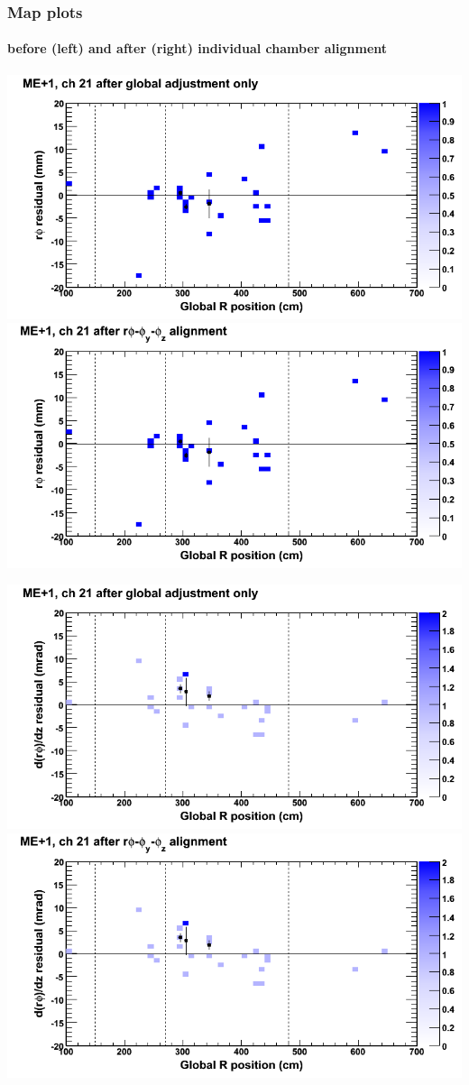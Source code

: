 \documentclass[compress]{beamer}
\begin{document}
\begin{frame}
\frametitle{Map plots}
\framesubtitle{before (left) and after (right) individual chamber alignment}
\includegraphics[width=0.5\linewidth]{ringmapplots_3dof/before_CSCvsr_mep1ch21_x.png} \includegraphics[width=0.5\linewidth]{ringmapplots_3dof/after_CSCvsr_mep1ch21_x.png}

\includegraphics[width=0.5\linewidth]{ringmapplots_3dof/before_CSCvsr_mep1ch21_dxdz.png} \includegraphics[width=0.5\linewidth]{ringmapplots_3dof/after_CSCvsr_mep1ch21_dxdz.png}
\end{frame}
\end{document}
